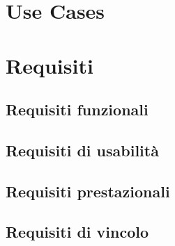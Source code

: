 \documentclass[11pt]{article}
\begin{document}
\begin{justify}
\section{Use Cases}


\section{Requisiti}
\subsection{Requisiti funzionali}
\subsection{Requisiti di usabilità}
\subsection{Requisiti prestazionali}
\subsection{Requisiti di vincolo}


\end{justify}
\end{document}
